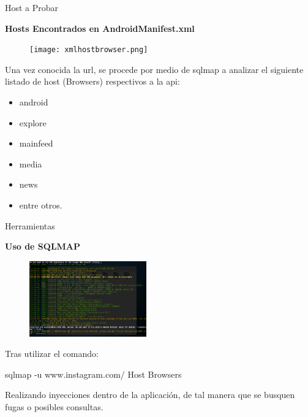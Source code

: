 \begin{frame}[t,fragile]{Host a Probar}

\textbf{Hosts Encontrados en AndroidManifest.xml}

\begin{figure} 
\vspace{2pt}
  \begin{center}
    \texttt{[image: xmlhostbrowser.png]}
    \label{fig:databaseUserTable}
  \end{center}
  \vspace{2pt}
\end{figure} 

\bigskip

Una vez conocida la url, se procede por medio de sqlmap a analizar el siguiente listado de host (Browsers) respectivos a la api:


\begin{itemize}
\item android
\item explore
\item mainfeed
\item media
\item news
\item entre otros.
\end{itemize}

\end{frame}

\begin{frame}[t,fragile]{Herramientas}

\textbf{Uso de SQLMAP}

\begin{figure} 
\vspace{2pt}
  \begin{center}
    \includegraphics[width=0.45\textwidth]{testsqlmap.png}
    \label{fig:databaseUserTable}
  \end{center}
  \vspace{2pt}
\end{figure} 

\bigskip

 Tras utilizar el comando:
 
 \begin{center}
     sqlmap -u www.instagram.com/ Host Browsers 
 \end{center}
 
 Realizando inyecciones dentro de la aplicación, de tal manera que se busquen fugas o posibles consultas. 

\end{frame}


